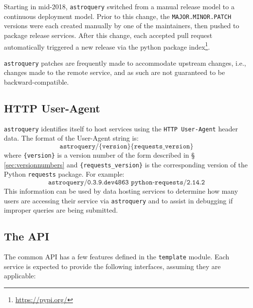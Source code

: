 \documentclass[twocolumn]{aastex62}
\newcommand{\package}[1]{\texttt{#1}\xspace}
\newcommand{\astroquery}{\package{astroquery}}
\newcommand{\astropypkg}{\package{astropy}}
\begin{document}
Starting in mid-2018, \astroquery switched from a manual release model to a
continuous deployment model.  Prior to this change, the
\texttt{MAJOR.MINOR.PATCH} versions were each created manually by one of the
maintainers, then pushed to package release services.  After this change, each
accepted pull request automatically triggered a new release via the python
package index\footnote{\url{https://pypi.org/}}. 

\astroquery patches are frequently made to accommodate upstream changes, i.e.,
changes made to the remote service, and as such are not guaranteed to be
backward-compatible.

%

\subsection{HTTP User-Agent}
\label{sec:useragent}
\astroquery identifies itself to host services using the \texttt{HTTP
User-Agent} header data.  The format of the User-Agent string is:
\[\texttt{astroquery/\{version\} \{requests\_version\}}\] where
\texttt{\{version\}} is a version number of the form described in \S
\ref{sec:versionnumbers} and \texttt{\{requests\_version\}} is the
corresponding version of the Python \package{requests} package. For example:
\[\texttt{astroquery/0.3.9.dev4863 python-requests/2.14.2}\]
This information
can be used by data hosting services to determine how many users are accessing
their service via \astroquery and to assist in debugging if improper queries
are being submitted.


\subsection{The API}
The common API has a few features defined in the \texttt{template} module.
Each service is expected to provide the following interfaces, assuming they are
applicable:
\end{document}
